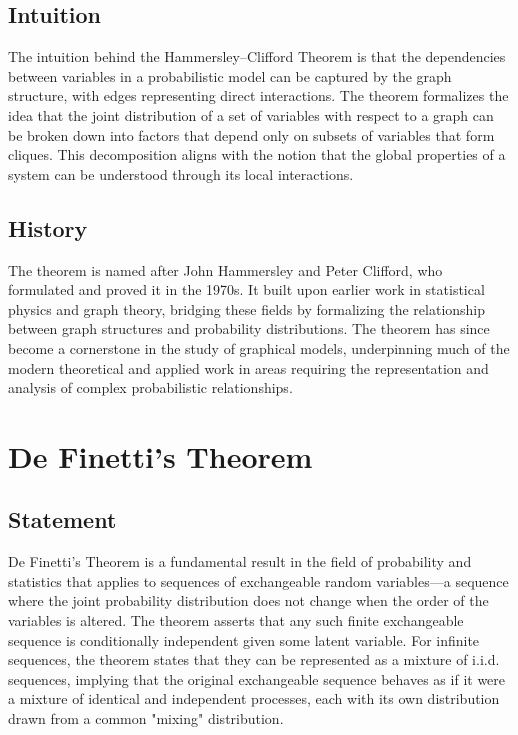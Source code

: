 \documentclass{article}
\begin{document}
\subsection{Intuition}
The intuition behind the Hammersley–Clifford Theorem is that the dependencies between variables in a probabilistic model can be captured by the graph structure, with edges representing direct interactions. The theorem formalizes the idea that the joint distribution of a set of variables with respect to a graph can be broken down into factors that depend only on subsets of variables that form cliques. This decomposition aligns with the notion that the global properties of a system can be understood through its local interactions.

\subsection{History}
The theorem is named after John Hammersley and Peter Clifford, who formulated and proved it in the 1970s. It built upon earlier work in statistical physics and graph theory, bridging these fields by formalizing the relationship between graph structures and probability distributions. The theorem has since become a cornerstone in the study of graphical models, underpinning much of the modern theoretical and applied work in areas requiring the representation and analysis of complex probabilistic relationships.

\section{De Finetti's Theorem}

\subsection{Statement}
De Finetti's Theorem is a fundamental result in the field of probability and statistics that applies to sequences of exchangeable random variables—a sequence where the joint probability distribution does not change when the order of the variables is altered. The theorem asserts that any such finite exchangeable sequence is conditionally independent given some latent variable. For infinite sequences, the theorem states that they can be represented as a mixture of i.i.d. sequences, implying that the original exchangeable sequence behaves as if it were a mixture of identical and independent processes, each with its own distribution drawn from a common "mixing" distribution.
\end{document}
